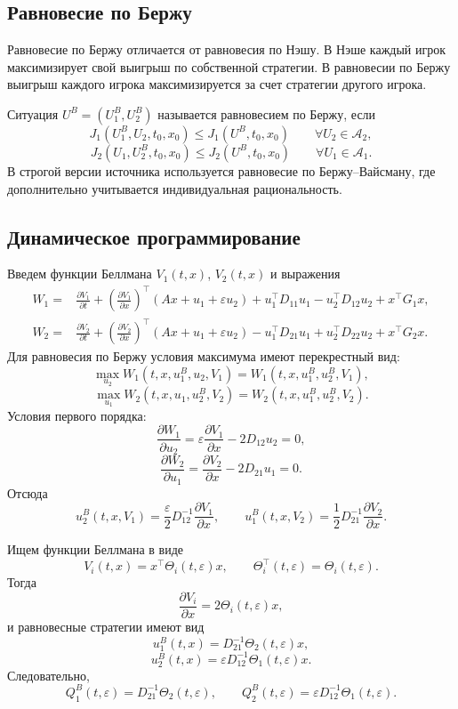 \documentclass[12pt,a4paper]{article}
\begin{document}
\subsection*{Равновесие по Бержу}
Равновесие по Бержу отличается от равновесия по Нэшу. В Нэше каждый игрок максимизирует свой выигрыш по собственной стратегии. В равновесии по Бержу выигрыш каждого игрока максимизируется за счет стратегии другого игрока.

Ситуация \(U^B=(U_1^B,U_2^B)\) называется равновесием по Бержу, если
\[
J_1(U_1^B,U_2,t_0,x_0)\le J_1(U^B,t_0,x_0)
\qquad \forall U_2\in\mathcal A_2,
\]
\[
J_2(U_1,U_2^B,t_0,x_0)\le J_2(U^B,t_0,x_0)
\qquad \forall U_1\in\mathcal A_1.
\]
В строгой версии источника используется равновесие по Бержу--Вайсману, где дополнительно учитывается индивидуальная рациональность.

\subsection*{Динамическое программирование}
Введем функции Беллмана \(V_1(t,x)\), \(V_2(t,x)\) и выражения
\[
\begin{aligned}
W_1={}&\frac{\partial V_1}{\partial t}+\left(\frac{\partial V_1}{\partial x}\right)^{\top}(Ax+u_1+\varepsilon u_2)
+u_1^{\top}D_{11}u_1-u_2^{\top}D_{12}u_2+x^{\top}G_1x,\\
W_2={}&\frac{\partial V_2}{\partial t}+\left(\frac{\partial V_2}{\partial x}\right)^{\top}(Ax+u_1+\varepsilon u_2)
-u_1^{\top}D_{21}u_1+u_2^{\top}D_{22}u_2+x^{\top}G_2x.
\end{aligned}
\]
Для равновесия по Бержу условия максимума имеют перекрестный вид:
\[
\max_{u_2}W_1(t,x,u_1^B,u_2,V_1)=W_1(t,x,u_1^B,u_2^B,V_1),
\]
\[
\max_{u_1}W_2(t,x,u_1,u_2^B,V_2)=W_2(t,x,u_1^B,u_2^B,V_2).
\]
Условия первого порядка:
\[
\frac{\partial W_1}{\partial u_2}=\varepsilon\frac{\partial V_1}{\partial x}-2D_{12}u_2=0,
\]
\[
\frac{\partial W_2}{\partial u_1}=\frac{\partial V_2}{\partial x}-2D_{21}u_1=0.
\]
Отсюда
\[
u_2^B(t,x,V_1)=\frac{\varepsilon}{2}D_{12}^{-1}\frac{\partial V_1}{\partial x},
\qquad
u_1^B(t,x,V_2)=\frac12D_{21}^{-1}\frac{\partial V_2}{\partial x}.
\]

Ищем функции Беллмана в виде
\[
V_i(t,x)=x^{\top}\Theta_i(t,\varepsilon)x,
\qquad \Theta_i^{\top}(t,\varepsilon)=\Theta_i(t,\varepsilon).
\]
Тогда
\[
\frac{\partial V_i}{\partial x}=2\Theta_i(t,\varepsilon)x,
\]
и равновесные стратегии имеют вид
\[
u_1^B(t,x)=D_{21}^{-1}\Theta_2(t,\varepsilon)x,
\]
\[
u_2^B(t,x)=\varepsilon D_{12}^{-1}\Theta_1(t,\varepsilon)x.
\]
Следовательно,
\[
Q_1^B(t,\varepsilon)=D_{21}^{-1}\Theta_2(t,\varepsilon),
\qquad
Q_2^B(t,\varepsilon)=\varepsilon D_{12}^{-1}\Theta_1(t,\varepsilon).
\]
\end{document}
